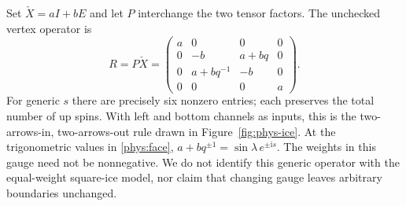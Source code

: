 \documentclass[a4paper,11pt,oneside,reqno]{amsart}
\theoremstyle{definition}
\numberwithin{equation}{section}
\begin{document}
Set $\check X=aI+bE$ and let $P$ interchange the two tensor factors.
The unchecked vertex operator is
\begin{equation}\label{phys:ice-matrix}
 R=P\check X=
 \begin{pmatrix}
 a&0&0&0\\
 0&-b&a+bq&0\\
 0&a+bq^{-1}&-b&0\\
 0&0&0&a
 \end{pmatrix}.
\end{equation}
For generic $s$ there are precisely six nonzero entries; each preserves
the total number of up spins. With left and bottom channels as inputs,
this is the two-arrows-in, two-arrows-out rule drawn in
Figure~\ref{fig:phys-ice}. At the trigonometric values in \eqref{phys:face},
$a+bq^{\pm1}=\sin\lambda\,e^{\pm\mathrm i s}$.
The weights in this gauge need not be nonnegative. We do not identify
this generic operator with the equal-weight square-ice model, nor claim
that changing gauge leaves arbitrary boundaries unchanged.
\end{document}
